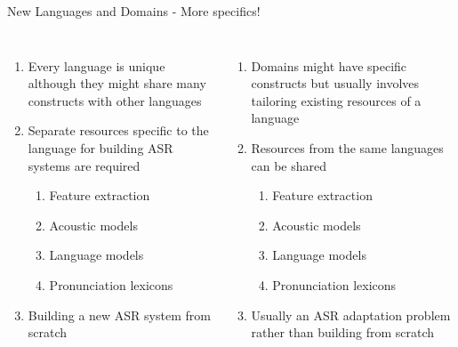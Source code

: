 \begin{frame}{New Languages and Domains - More specifics!}
\begin{columns}[T]
\column{2in}
\centering
{\color{orange}{New Languages}}
\begin{enumerate}
\item Every language is \alert{unique} although they might share many constructs with other languages
\item \alert{Separate resources} specific to the language for building ASR systems are required
\begin{enumerate}
\item Feature extraction
\item Acoustic models
\item Language models
\item Pronunciation lexicons
\end{enumerate}
\item \alert{Building a new ASR system from scratch}
\end{enumerate}
\column{2in}
\centering
{\color{ForestGreen}{New Domains}}
\begin{enumerate}
\item Domains might have specific constructs but usually involves \alert{tailoring existing resources} of a language
\item Resources from the same languages can be \alert{shared}
\begin{enumerate}
\item Feature extraction
\item Acoustic models
\item Language models
\item Pronunciation lexicons
\end{enumerate}
\item Usually \alert{an ASR adaptation problem} rather than building from scratch
\end{enumerate}
\end{columns}
\end{frame}
